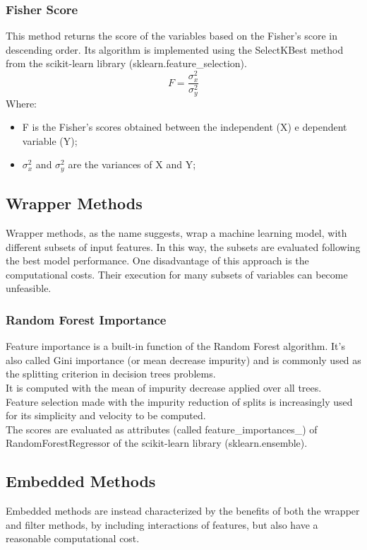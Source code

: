 \subsubsection{Fisher Score}
This method returns the score of the variables based on the Fisher’s score in descending order. \newline
Its algorithm is implemented using the SelectKBest method from the scikit-learn library (sklearn.feature\_selection).\newline
\begin{equation}
F = \frac{\sigma_x^2}{\sigma_y^2}
\end{equation}
Where:
\begin{itemize}
\item F is the Fisher's scores obtained between the independent (X) e dependent variable (Y);
    \item $\sigma_x^2$ and $\sigma_y^2$ are the variances of X and Y;
\end{itemize}
\bigbreak
\subsection{Wrapper Methods}
Wrapper methods, as the name suggests, wrap a machine learning model, with different subsets of input features. In this way, the subsets are evaluated following the best model performance.
One disadvantage of this approach is the computational costs.\newline
Their execution for many subsets of variables can become unfeasible. 
\subsubsection{Random Forest Importance}
Feature importance is a built-in function of the Random Forest algorithm. It's also called Gini importance (or mean decrease impurity) and is commonly used as the splitting criterion in decision trees problems. \\
It is computed with the mean of impurity decrease applied over all trees. \\ 
Feature selection made with the impurity reduction of splits is increasingly used for its simplicity and velocity to be computed.\\
The scores are evaluated as attributes (called feature\_importances\_) of RandomForestRegressor of the scikit-learn library \cite{sklearn} (sklearn.ensemble).
\bigbreak
\subsection{Embedded Methods}
Embedded methods are instead characterized by the benefits of both the wrapper and filter methods, by including interactions of features, but also have a reasonable computational cost.
